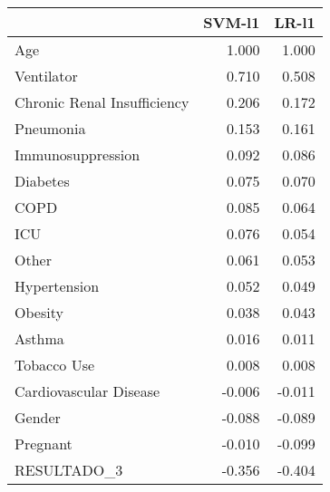 \begin{tabular}{lrr}
\toprule
{} &  SVM-l1 &  LR-l1 \\
\midrule
Age                         &   1.000 &  1.000 \\
Ventilator                  &   0.710 &  0.508 \\
Chronic Renal Insufficiency &   0.206 &  0.172 \\
Pneumonia                   &   0.153 &  0.161 \\
Immunosuppression           &   0.092 &  0.086 \\
Diabetes                    &   0.075 &  0.070 \\
COPD                        &   0.085 &  0.064 \\
ICU                         &   0.076 &  0.054 \\
Other                       &   0.061 &  0.053 \\
Hypertension                &   0.052 &  0.049 \\
Obesity                     &   0.038 &  0.043 \\
Asthma                      &   0.016 &  0.011 \\
Tobacco Use                 &   0.008 &  0.008 \\
Cardiovascular Disease      &  -0.006 & -0.011 \\
Gender                      &  -0.088 & -0.089 \\
Pregnant                    &  -0.010 & -0.099 \\
RESULTADO\_3                 &  -0.356 & -0.404 \\
\bottomrule
\end{tabular}
